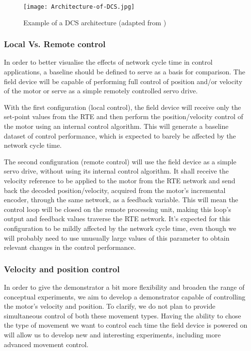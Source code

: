 \begin{figure}[t]
	\centering
	\texttt{[image: Architecture-of-DCS.jpg]}
	\caption{Example of a DCS architecture (adapted from \cite{misc:dcs-architecture})}
	\label{fig:dcs-architecture}
\end{figure}

\subsubsection{Local Vs. Remote control} \label{subsec:local_remote}

In order to better visualise the effects of network cycle time in control applications, a baseline should be defined to serve as a basis for comparison.
The field device will be capable of performing full control of position and/or velocity of the motor or serve as a simple remotely controlled servo drive.

With the first configuration (local control), the field device will receive only the set-point values from the RTE and then perform the position/velocity control of the motor using an internal control algorithm.
This will generate a baseline dataset of control performance, which is expected to barely be affected by the network cycle time.

The second configuration (remote control) will use the field device as a simple servo drive, without using its internal control algorithm.
It shall receive the velocity reference to be applied to the motor from the RTE network and send back the decoded position/velocity, acquired from the motor's incremental encoder, through the same network, as a feedback variable.
This will mean the control loop will be closed on the remote processing unit, making this loop's output and feedback values traverse the RTE network.
It's expected for this configuration to be mildly affected by the network cycle time, even though we will probably need to use unusually large values of this parameter to obtain relevant changes in the control performance.

\subsubsection{Velocity and position control}

In order to give the demonstrator a bit more flexibility and broaden the range of conceptual experiments, we aim to develop a demonstrator capable of controlling the motor's velocity and position.
To clarify, we do not plan to provide simultaneous control of both these movement types.
Having the ability to chose the type of movement we want to control each time the field device is powered on will allow us to develop new and interesting experiments, including more advanced movement control.
